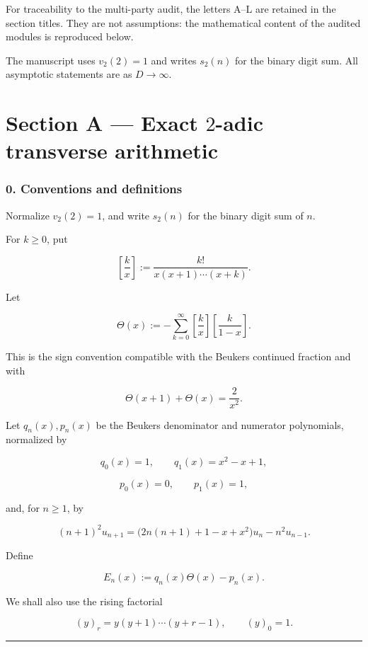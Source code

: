 \documentclass[
  10pt,
  letterpaper,
]{article}
\theoremstyle{definition}
\theoremstyle{remark}
\begin{document}
For traceability to the multi-party audit, the letters A--L are retained
in the section titles. They are not assumptions: the mathematical
content of the audited modules is reproduced below.

The manuscript uses \(v_2(2)=1\) and writes \(s_2(n)\) for the binary
digit sum. All asymptotic statements are as \(D\to\infty\).

\section{\texorpdfstring{Section A --- Exact \(2\)-adic transverse
arithmetic}{Section A --- Exact 2-adic transverse arithmetic}}\label{section-a-exact-2-adic-transverse-arithmetic}

\subsubsection{0. Conventions and
definitions}\label{conventions-and-definitions}

Normalize \(v_2(2)=1\), and write \(s_2(n)\) for the binary digit sum of
\(n\).

For \(k\ge 0\), put

\[
\left[\frac{k}{x}\right]
:=
\frac{k!}{x(x+1)\cdots(x+k)}.
\]

Let

\[
\Theta(x)
:=
-\sum_{k=0}^{\infty}
\left[\frac{k}{x}\right]
\left[\frac{k}{1-x}\right].
\]

This is the sign convention compatible with the Beukers continued
fraction and with

\[
\boxed{\Theta(x+1)+\Theta(x)=\frac{2}{x^2}.}
\]

Let \(q_n(x),p_n(x)\) be the Beukers denominator and numerator
polynomials, normalized by

\[
q_0(x)=1,\qquad q_1(x)=x^2-x+1,
\]

\[
p_0(x)=0,\qquad p_1(x)=1,
\]

and, for \(n\ge1\), by

\[
(n+1)^2u_{n+1}
=
\bigl(2n(n+1)+1-x+x^2\bigr)u_n
-
n^2u_{n-1}.
\]

Define

\[
E_n(x):=q_n(x)\Theta(x)-p_n(x).
\]

We shall also use the rising factorial

\[
(y)_r=y(y+1)\cdots(y+r-1),\qquad (y)_0=1.
\]

\begin{center}\rule{0.5\linewidth}{0.5pt}\end{center}
\end{document}
